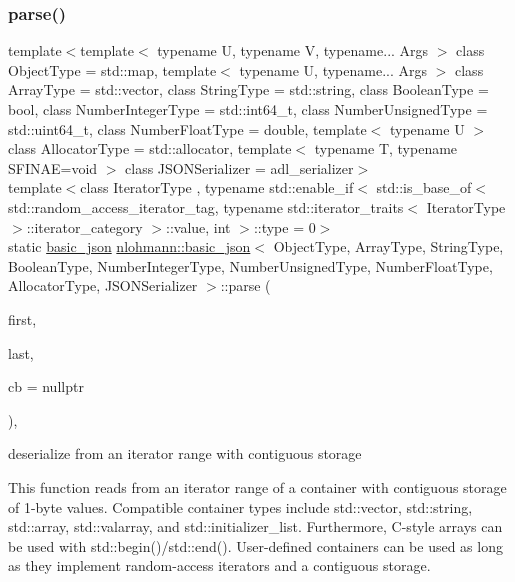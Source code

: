 \subsubsection{\texorpdfstring{parse()}{parse()}\hspace{0.1cm}{\footnotesize\ttfamily [5/6]}}
{\footnotesize\ttfamily template$<$template$<$ typename U, typename V, typename... Args $>$ class Object\+Type = std\+::map, template$<$ typename U, typename... Args $>$ class Array\+Type = std\+::vector, class String\+Type  = std\+::string, class Boolean\+Type  = bool, class Number\+Integer\+Type  = std\+::int64\+\_\+t, class Number\+Unsigned\+Type  = std\+::uint64\+\_\+t, class Number\+Float\+Type  = double, template$<$ typename U $>$ class Allocator\+Type = std\+::allocator, template$<$ typename T, typename S\+F\+I\+N\+A\+E=void $>$ class J\+S\+O\+N\+Serializer = adl\+\_\+serializer$>$ \\
template$<$class Iterator\+Type , typename std\+::enable\+\_\+if$<$ std\+::is\+\_\+base\+\_\+of$<$ std\+::random\+\_\+access\+\_\+iterator\+\_\+tag, typename std\+::iterator\+\_\+traits$<$ Iterator\+Type $>$\+::iterator\+\_\+category $>$\+::value, int $>$\+::type  = 0$>$ \\
static \mbox{\hyperlink{classnlohmann_1_1basic__json}{basic\+\_\+json}} \mbox{\hyperlink{classnlohmann_1_1basic__json}{nlohmann\+::basic\+\_\+json}}$<$ Object\+Type, Array\+Type, String\+Type, Boolean\+Type, Number\+Integer\+Type, Number\+Unsigned\+Type, Number\+Float\+Type, Allocator\+Type, J\+S\+O\+N\+Serializer $>$\+::parse (\begin{DoxyParamCaption}\item[{Iterator\+Type}]{first,  }\item[{Iterator\+Type}]{last,  }\item[{const \mbox{\hyperlink{classnlohmann_1_1basic__json_aecae491e175f8767c550ae3c59e180e3}{parser\+\_\+callback\+\_\+t}}}]{cb = {\ttfamily nullptr} }\end{DoxyParamCaption})\hspace{0.3cm}{\ttfamily [inline]}, {\ttfamily [static]}}



deserialize from an iterator range with contiguous storage 

This function reads from an iterator range of a container with contiguous storage of 1-\/byte values. Compatible container types include {\ttfamily std\+::vector}, {\ttfamily std\+::string}, {\ttfamily std\+::array}, {\ttfamily std\+::valarray}, and {\ttfamily std\+::initializer\+\_\+list}. Furthermore, C-\/style arrays can be used with {\ttfamily std\+::begin()}/{\ttfamily std\+::end()}. User-\/defined containers can be used as long as they implement random-\/access iterators and a contiguous storage.

